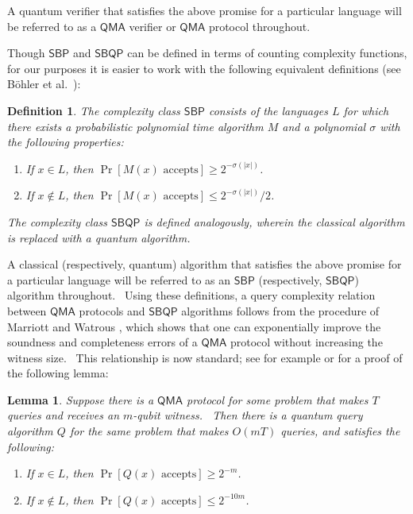 \documentclass[10pt,a4paper]{article}
\newtheorem{definition}[theorem]{Definition}
\newtheorem{lemma}[theorem]{Lemma}
\newcommand{\<}{\langle}
\renewcommand{\>}{\rangle}
\begin{document}
A quantum verifier that satisfies the above
promise for a particular language will be referred to as a $\mathsf{QMA}$
verifier or $\mathsf{QMA}$ protocol throughout.

Though $\mathsf{SBP}$ and $\mathsf{SBQP}$ can be defined in terms of
counting complexity functions, for our purposes it is easier to
work with the following equivalent definitions (see B\"ohler et al.\ \cite
{BGM06}):

\begin{definition}
\label{def:sbp_sbqp} The complexity class $\mathsf{SBP}$ consists of the
languages $L$ for which there exists a probabilistic polynomial time
algorithm $M$ and a polynomial $\sigma$ with the following properties:

\begin{enumerate}
\item If $x \in L$, then $\Pr\left[M(x) \text{ accepts}\right] \ge
2^{-\sigma(|x|)}$.

\item If $x \not\in L$, then $\Pr\left[M(x) \text{ accepts}\right] \le
2^{-\sigma(|x|)}/2$.
\end{enumerate}

The complexity class $\mathsf{SBQP}$ is defined analogously, wherein the
classical algorithm is replaced with a quantum algorithm.
\end{definition}

A classical (respectively, quantum) algorithm that satisfies the above
promise for a particular language will be referred to as an $\mathsf{SBP}$
(respectively, $\mathsf{SBQP}$) algorithm throughout. \ Using these
definitions, a  query complexity relation between $\mathsf{QMA}$
protocols and $\mathsf{SBQP}$ algorithms follows from the procedure of
Marriott and Watrous \cite{marriott}, which shows that one can exponentially
improve the soundness and completeness errors of a $\mathsf{QMA}$ protocol
without increasing the witness size. \ 
This relationship is now standard; see
for example \cite[Remark 6]{marriott} or \cite[Proposition 4.2]
{sherstov2019vanishing} for a proof of the following lemma:

\begin{lemma} 
\label{lem:guessing} Suppose there is a $\mathsf{QMA}$ protocol for some
problem that makes $T$ queries and receives an $m$-qubit witness. \ Then
there is a quantum query algorithm $Q$ for the same problem that makes $O(mT)$ queries, and satisfies the following:

\begin{enumerate}
\item If $x \in L$, then $\Pr\left[Q(x) \text{ accepts}\right] \ge
2^{-m}$.

\item If $x \not\in L$, then $\Pr\left[Q(x) \text{ accepts}\right] \le
2^{-10m}$.
\end{enumerate}
\end{lemma}
\end{document}
